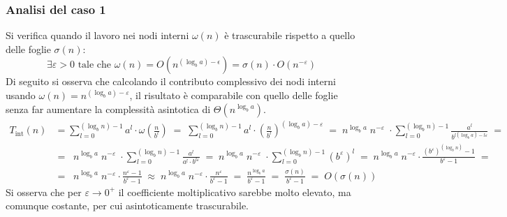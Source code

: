 \subsubsection*{Analisi del caso 1}
Si verifica quando il lavoro nei nodi interni \(\omega(n)\) è trascurabile rispetto a quello delle foglie \(\sigma(n)\):
\[\exists \varepsilon > 0 \text{ tale che } \omega(n) = O \! \left(n^{(\log_b a )- \epsilon}\right) = \sigma(n) \cdot O \! \left(n^{-\varepsilon}\right)\]
Di seguito si osserva che calcolando il contributo complessivo dei nodi interni usando \(\omega(n) = n ^{(\log_b a) - \varepsilon}\),
il risultato è comparabile con quello delle foglie senza far aumentare la complessità asintotica di \(\Theta(n^{\log_b a})\).
\begin{align*}
	T_{\text{int}}(n) &= \sum_{l=0}^{(\log_b n) - 1} a^l \cdot \omega \! \left( \frac{n}{b^l} \right) \; = \; \sum_{l=0}^{(\log_b n) - 1} a^l \cdot \left( \frac{n}{b^l} \right)^{(\log_b a) - \varepsilon} \; = \; n^{\log_b a} \; n^{-\varepsilon} \; \cdot \!\! \sum_{l=0}^{(\log_b n) - 1} \frac{a^l}{b^{l (\log_b a) - l \varepsilon}} \; = \\[3pt]
	&= \;\; n^{\log_b a} \; n^{-\varepsilon} \; \cdot \!\! \sum_{l=0}^{(\log_b n) - 1} \frac{a^l}{a^l \cdot b^{l \varepsilon}} \; = \; n^{\log_b a} \; n^{-\varepsilon} \; \cdot \!\! \sum_{l=0}^{(\log_b n) - 1} {(b^{\varepsilon})}^l \; = \; n^{\log_b a} \; n^{-\varepsilon} \cdot \frac{(b^{\varepsilon})^{(\log_b n)} - 1}{b^{\varepsilon} - 1} \; = \\[3pt]
	&= \;\; n^{\log_b a} \; n^{-\varepsilon} \cdot \frac{n^{\varepsilon} - 1}{b^{\varepsilon} - 1} \; \approx \; n^{\log_b a} \; n^{-\varepsilon} \cdot \frac{n^{\varepsilon}}{b^{\varepsilon} - 1} \; = \; \frac{n^{\log_b a}}{b^{\varepsilon} - 1} \; = \; \frac{\sigma(n)}{b^{\varepsilon} - 1} \; = \; O(\sigma(n))
\end{align*}
Si osserva che per \(\varepsilon \to 0^+\) il coefficiente moltiplicativo sarebbe molto elevato, ma comunque costante, per
cui asintoticamente trascurabile.

